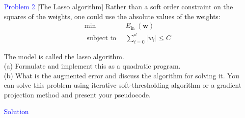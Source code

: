 \textcolor{blue}{Problem 2}
[The Lasso algorithm] Rather than a soft order constraint on the squares of the weights, one could use the absolute values of the weights:
\begin{align*}
\min &\ E_{\text {in }}(\mathbf{w}) \\
\text { subject to } &\ \sum_{i=0}^d\left|w_i\right| \leq C
\end{align*}

The model is called the lasso algorithm.\\
(a) Formulate and implement this as a quadratic program.\\
(b) What is the augmented error and discuss the algorithm for solving it. You can solve this problem using iterative soft-thresholding algorithm or a gradient projection method and present your pseudocode.

\textcolor{blue}{Solution}\\












\newpage